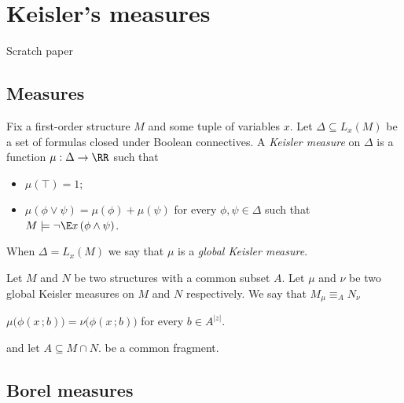 \documentclass[creche.tex]{subfiles}
\begin{document}
\chapter{Keisler's measures}
\label{measures}

\def\medrel#1{\parbox[t]{5ex}{$\displaystyle\hfil #1$}}
\def\ceq#1#2#3{\parbox[t]{18ex}{$\displaystyle #1$}\medrel{#2}{$\displaystyle #3$}}


\def\Msr{{\rm Msr\kern.0ex}}


Scratch paper

\section{Measures}

Fix a first-order structure $M$ and some tuple of variables $x$.
Let $\Delta\subseteq L_x(M)$ be a set of formulas closed under Boolean connectives.
A \emph{Keisler measure\/} on $\Delta$ is a function $\mu:\Delta\to\RR$ such that
\begin{itemize}
\item[1.] $\mu(\top)=1$;
\item[2.] $\mu(\phi\vee\psi)=\mu(\phi)+\mu(\psi)$ for every $\phi,\psi\in \Delta$ such that $M\models\neg\E x\,(\phi\wedge\psi)$.
\end{itemize}
When $\Delta=L_x(M)$ we say that $\mu$ is a \emph{global Keisler measure}.

% 
% 
% 
% 

Let $M$ and $N$ be two structures with a common subset $A$.
Let $\mu$ and $\nu$ be two global Keisler measures on $M$ and $N$ respectively.
We say that $M_\mu\equiv_A N_\nu$ 

$\mu\big(\phi(x\,;b)\big)=\nu\big(\phi(x\,;b)\big)$ for every $b\in A^{|z|}$.


and let $A\subseteq M\cap N$.
 be a common fragment.


\section{Borel measures}
\end{document}
